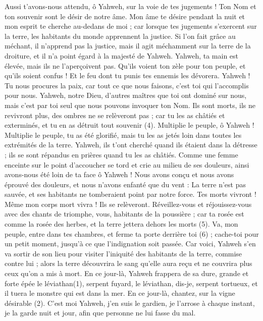 \begin{multicols}{2}
Aussi t'avons-nous attendu, ô Yahweh, sur la voie de tes jugements ! Ton Nom et ton souvenir sont le désir de notre âme.
Mon âme te désire pendant la nuit et mon esprit te cherche au-dedans de moi ; car lorsque tes jugements s’exercent sur la terre, les habitants du monde apprennent la justice.
Si l’on fait grâce au méchant, il n’apprend pas la justice, mais il agit méchamment sur la terre de la droiture, et il n’a point égard à la majesté de Yahweh.
Yahweh, ta main est élevée, mais ils ne l’aperçoivent pas. Qu’ils voient ton zèle pour ton peuple, et qu’ils soient confus ! Et le feu dont tu punis tes ennemis les dévorera.
Yahweh ! Tu nous procures la paix, car tout ce que nous faisons, c’est toi qui l’accomplis pour nous.
Yahweh, notre Dieu, d'autres maîtres que toi ont dominé sur nous, mais c'est par toi seul que nous pouvons invoquer ton Nom.
Ils sont morts, ils ne revivront plus, des ombres ne se relèveront pas ; car tu les as châtiés et exterminés, et tu en as détruit tout souvenir (4).
Multiplie le peuple, ô Yahweh ! Multiplie le peuple, tu as été glorifié, mais tu les as jetés loin dans toutes les extrémités de la terre.
Yahweh, ils t’ont cherché quand ils étaient dans la détresse ; ils se sont répandus en prières quand tu les as châtiés.
Comme une femme enceinte sur le point d’accoucher se tord et crie au milieu de ses douleurs, ainsi avons-nous été loin de ta face ô Yahweh !
Nous avons conçu et nous avons éprouvé des douleurs, et nous n’avons enfanté que du vent : La terre n’est pas sauvée, et ses habitants ne tomberaient point par notre force.
Tes morts vivront ! Même mon corps mort vivra ! Ils se relèveront. Réveillez-vous et réjouissez-vous avec des chants de triomphe, vous, habitants de la poussière ; car ta rosée est comme la rosée des herbes, et la terre jettera dehors les morts (5).
Va, mon peuple, entre dans tes chambres, et ferme ta porte derrière toi (6) ; cache-toi pour un petit moment, jusqu’à ce que l'indignation soit passée.
Car voici, Yahweh s'en va sortir de son lieu pour visiter l'iniquité des habitants de la terre, commise contre lui ; alors la terre découvrira le sang qu'elle aura reçu et ne couvrira plus ceux qu'on a mis à mort.
\VerseOne{}En ce jour-là, Yahweh frappera de sa dure, grande et forte épée le léviathan(1), serpent fuyard, le léviathan, dis-je, serpent tortueux, et il tuera le monstre qui est dans la mer.
En ce jour-là, chantez, sur la vigne désirable (2).
C'est moi Yahweh, j’en suis le gardien, je l'arrose à chaque instant, je la garde nuit et jour, afin que personne ne lui fasse du mal.

\end{multicols}

